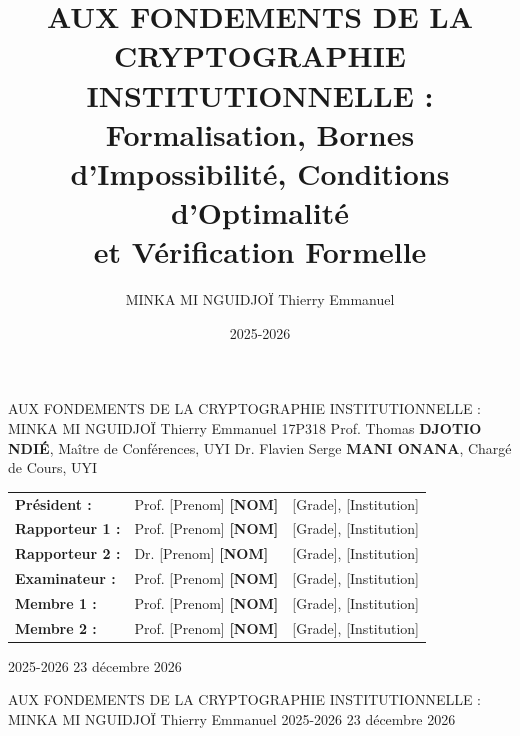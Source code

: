 \documentclass[a4paper,11pt,reqno,oneside]{memoir}
\title{AUX FONDEMENTS DE LA CRYPTOGRAPHIE INSTITUTIONNELLE :\\
       Formalisation, Bornes d'Impossibilité, Conditions d'Optimalité\\
       et Vérification Formelle}
\author{MINKA MI NGUIDJOÏ Thierry Emmanuel}
\date{2025-2026}
\begin{document}
\ancrerTableaux
\activerBarrieresFlottants

\frontmatter
\renewcommand{\enspDiplome}{Doctorat/Ph.D en Informatique}
\renewcommand{\enspSpecialite}{Cryptographie et S\'ecurit\'e de l'Information}

\couvertureENSP%
  {AUX FONDEMENTS DE LA CRYPTOGRAPHIE INSTITUTIONNELLE :}%
  {}%
  {MINKA MI NGUIDJO\"I Thierry Emmanuel}%
  {17P318}%
  {Prof. Thomas \textbf{DJOTIO NDI\'E}, Ma\^itre de Conf\'erences, UYI}%
  {Dr. Flavien Serge \textbf{MANI ONANA}, Charg\'e de Cours, UYI}%
  {%
    \small
    \begin{tabular}{@{}lll@{}}
      \textbf{Pr\'esident :}    & Prof. [Prenom] \textbf{[NOM]}   & [Grade], [Institution]         \\[0.2cm]
      \textbf{Rapporteur 1 :}  & Prof. [Prenom] \textbf{[NOM]}    & [Grade], [Institution]  \\[0.2cm]
      \textbf{Rapporteur 2 :}  & Dr. [Prenom] \textbf{[NOM]}   & [Grade], [Institution]         \\[0.2cm]
      \textbf{Examinateur :} & Prof. [Prenom] \textbf{[NOM]}    & [Grade], [Institution]       \\[0.2cm]
      \textbf{Membre 1 :} & Prof.   [Prenom] \textbf{[NOM]}    & [Grade], [Institution]         \\[0.2cm]
      \textbf{Membre 2 :}    & Prof.    [Prenom] \textbf{[NOM]}  & [Grade], [Institution]       \\
    \end{tabular}%
  }%
  {2025-2026}%
  {23 d\'ecembre 2026}%

\couvertureENSPblanche%
  {AUX FONDEMENTS DE LA CRYPTOGRAPHIE INSTITUTIONNELLE :}%
  {}%
  {MINKA MI NGUIDJO\"I Thierry Emmanuel}%
  {2025-2026}%
  {23 d\'ecembre 2026}%

\pagestyle{preliminaire}






\end{document}
